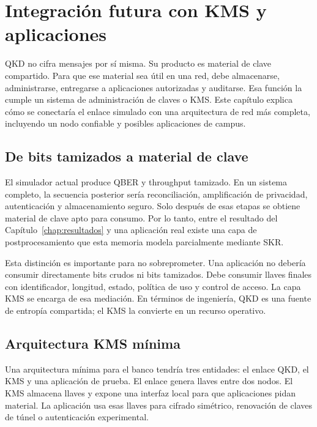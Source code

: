 \chapter{Integración futura con KMS y aplicaciones}
\label{chap:kms}

QKD no cifra mensajes por sí misma. Su producto es material de clave compartido. Para que ese material sea útil en una red, debe almacenarse, administrarse, entregarse a aplicaciones autorizadas y auditarse. Esa función la cumple un sistema de administración de claves o KMS. Este capítulo explica cómo se conectaría el enlace simulado con una arquitectura de red más completa, incluyendo un nodo confiable y posibles aplicaciones de campus.

\section{De bits tamizados a material de clave}

El simulador actual produce QBER y throughput tamizado. En un sistema completo, la secuencia posterior sería reconciliación, amplificación de privacidad, autenticación y almacenamiento seguro. Solo después de esas etapas se obtiene material de clave apto para consumo. Por lo tanto, entre el resultado del Capítulo~\ref{chap:resultados} y una aplicación real existe una capa de postprocesamiento que esta memoria modela parcialmente mediante SKR.

Esta distinción es importante para no sobreprometer. Una aplicación no debería consumir directamente bits crudos ni bits tamizados. Debe consumir llaves finales con identificador, longitud, estado, política de uso y control de acceso. La capa KMS se encarga de esa mediación. En términos de ingeniería, QKD es una fuente de entropía compartida; el KMS la convierte en un recurso operativo.

\section{Arquitectura KMS mínima}

Una arquitectura mínima para el banco tendría tres entidades: el enlace QKD, el KMS y una aplicación de prueba. El enlace genera llaves entre dos nodos. El KMS almacena llaves y expone una interfaz local para que aplicaciones pidan material. La aplicación usa esas llaves para cifrado simétrico, renovación de claves de túnel o autenticación experimental.

